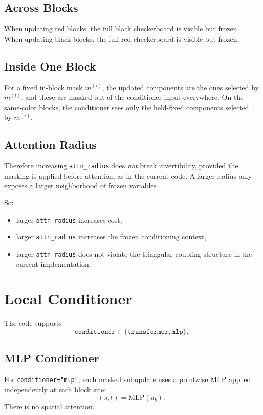 \documentclass[11pt]{article}
\begin{document}
\subsection{Across Blocks}

When updating red blocks, the full black checkerboard is visible but frozen.
When updating black blocks, the full red checkerboard is visible but frozen.

\subsection{Inside One Block}

For a fixed in-block mask $m^{(i)}$, the updated components are the ones
selected by $\bar m^{(i)}$, and these are masked out of the conditioner input
everywhere. On the same-color blocks, the conditioner sees only the held-fixed
components selected by $m^{(i)}$.

\subsection{Attention Radius}

Therefore increasing \texttt{attn\_radius} does \emph{not} break
invertibility, provided the masking is applied before attention, as in the
current code. A larger radius only exposes a larger neighborhood of frozen
variables.

So:
\begin{itemize}
\item larger \texttt{attn\_radius} increases cost,
\item larger \texttt{attn\_radius} increases the frozen conditioning context,
\item larger \texttt{attn\_radius} does not violate the triangular coupling
structure in the current implementation.
\end{itemize}

\section{Local Conditioner}

The code supports
\[
\texttt{conditioner}\in\{\texttt{transformer},\texttt{mlp}\}.
\]

\subsection{MLP Conditioner}

For \texttt{conditioner="mlp"}, each masked subupdate uses a pointwise MLP
applied independently at each block site:
\[
(s,t)=\mathrm{MLP}(u_b).
\]
There is no spatial attention.
\end{document}
